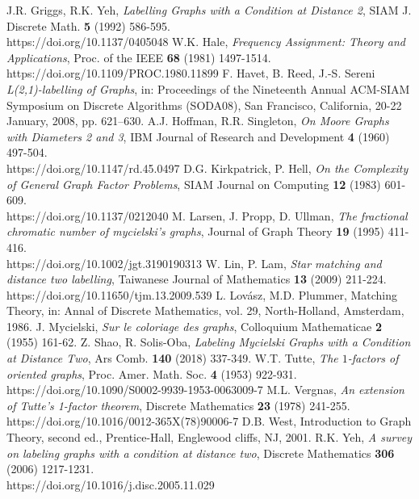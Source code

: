 \documentclass{article}
\newtheorem{open problem} {Open Problem}
\numberwithin{lemma}{section}
\numberwithin{theorem}{section}
\numberwithin{cor}{section}
\numberwithin{prop}{section}
\numberwithin{con}{section}
\numberwithin{claim}{section}
\numberwithin{obs}{section}
\numberwithin{dnt}{section}
\begin{document}
\begin{thebibliography}{99}
 J.R. Griggs, R.K. Yeh,  \textit{Labelling Graphs with a Condition at Distance 2}, SIAM J. Discrete Math.  \textbf{5} (1992) 586-595. \\ https://doi.org/10.1137/0405048
	W.K. Hale, \textit{Frequency Assignment: Theory and Applications}, Proc. of the IEEE  \textbf{68} (1981) 1497-1514. \\ https://doi.org/10.1109/PROC.1980.11899	
	F. Havet, B. Reed, J.-S. Sereni \textit{L(2,1)-labelling of Graphs}, in: Proceedings of the Nineteenth Annual ACM-SIAM Symposium on Discrete Algorithms (SODA08), San Francisco, California, 20-22 January, 2008, pp. 621–630.
 A.J. Hoffman, R.R. Singleton, \textit{On Moore Graphs with Diameters 2 and 3}, IBM Journal of Research and Development \textbf{4} (1960) 497-504. \\ https://doi.org/10.1147/rd.45.0497
	D.G. Kirkpatrick, P. Hell, \textit{On the Complexity of General Graph Factor Problems},  SIAM Journal on Computing \textbf{12} (1983) 601-609. \\ https://doi.org/10.1137/0212040		
 M. Larsen, J. Propp, D. Ullman, \textit{The fractional chromatic number of mycielski's graphs}, Journal of Graph Theory  \textbf{19} (1995) 411-416. \\ https://doi.org/10.1002/jgt.3190190313
	W. Lin, P. Lam, \textit{Star matching and distance two labelling}, Taiwanese Journal of Mathematics  \textbf{13} (2009) 211-224. \\ https://doi.org/10.11650/tjm.13.2009.539
	L. Lovász, M.D. Plummer, Matching Theory, in: Annal of Discrete Mathematics, vol. 29, North-Holland, Amsterdam, 1986.	
 J. Mycielski,  \textit{Sur le coloriage des graphs}, Colloquium Mathematicae  \textbf{2} (1955) 161-62.	
	Z. Shao, R. Solis-Oba, \textit{Labeling Mycielski Graphs with a Condition at Distance Two}, Ars Comb. \textbf{140} (2018) 337-349.	
	W.T. Tutte, \textit{The $1$-factors of oriented graphs},  Proc. Amer. Math. Soc. \textbf{4} (1953) 922-931. \\ https://doi.org/10.1090/S0002-9939-1953-0063009-7
 M.L. Vergnas, \textit{An extension of Tutte's 1-factor theorem}, Discrete Mathematics \textbf{23}  (1978) 241-255. \\ https://doi.org/10.1016/0012-365X(78)90006-7
  D.B. West, Introduction to Graph Theory, second ed., Prentice-Hall, Englewood cliffs, NJ, 2001.
	R.K. Yeh, \textit{A survey on labeling graphs with a condition at distance two},  Discrete Mathematics \textbf{306} (2006) 1217-1231. \\ https://doi.org/10.1016/j.disc.2005.11.029
\end{thebibliography}
\end{document}
